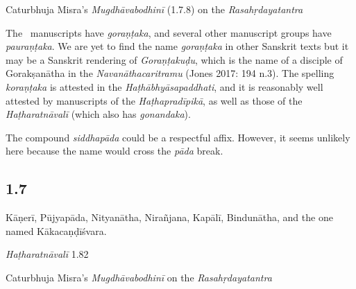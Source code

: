 \begin{ekdosis}
\begin{testimonia}[hp01_006]
Caturbhuja Misra's \emph{Mugdhāvabodhinī} (1.7.8) on the \emph{Rasahṛdayatantra}

\begin{versinnote}
\end{versinnote}

\end{testimonia}

\begin{philcomm}[hp01_006]        
The \textalpha\ manuscripts have \emph{goraṇṭaka}, and several other manuscript groups have \emph{pauraṇṭaka}.  We are yet to find the name \emph{goraṇṭaka} in other Sanskrit texts but it may be a Sanskrit rendering of \emph{Goraṇṭakuḍu}, which is the name of a disciple of Gorakṣanātha in the \emph{Navanāthacaritramu} (Jones 2017: 194 n.3). The spelling \emph{koraṇṭaka} is attested in the \emph{Haṭhābhyāsapaddhati}, and it is reasonably well attested by manuscripts of the \emph{Haṭhapradīpikā}, as well as those of the \emph{Haṭharatnāvalī} (which also has \emph{gonandaka}).

The compound \emph{siddhapāda} could be a respectful affix. However, it seems unlikely here because the name would cross the \emph{pāda} break.  

\end{philcomm}

\subsection*{1.7}
\begin{translation}[hp01_007]
Kāṇerī, Pūjyapāda, Nityanātha, Nirañjana, Kapālī, Bindunātha, and the one named Kākacaṇḍīśvara.
\end{translation}

\begin{testimonia}[hp01_007]
\emph{Haṭharatnāvalī} 1.82

\begin{versinnote}
\end{versinnote}

Caturbhuja Misra's \emph{Mugdhāvabodhinī} on the \emph{Rasahṛdayatantra}


\end{testimonia}
\end{ekdosis}
